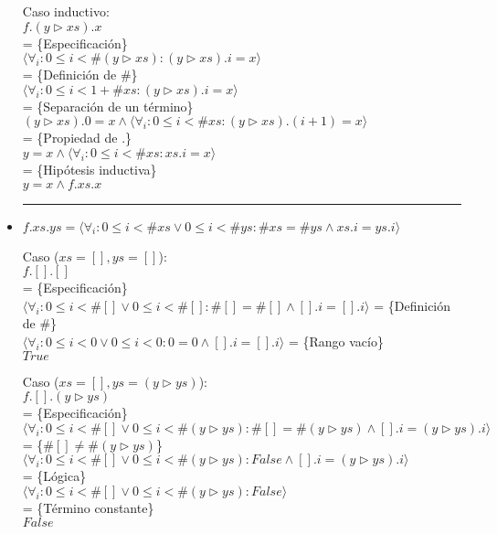 \documentclass[12pt]{article}
\begin{document}
\begin{itemize}
    \bigbreak

    Caso inductivo:\\
    $ f.(y \triangleright xs).x $\\
    = \{Especificación\}\\
    $ \langle \forall_i : 0 \le i < \#(y \triangleright xs) : (y \triangleright xs).i = x \rangle $\\
    = \{Definición de \#\}\\
    $ \langle \forall_i : 0 \le i < 1 + \#xs : (y \triangleright xs).i = x \rangle $\\
    = \{Separación de un término\}\\
    $ (y \triangleright xs).0 = x \land \langle \forall_i : 0 \le i < \#xs : (y \triangleright xs).(i + 1) = x \rangle $\\
    = \{Propiedad de .\}\\
    $ y = x \land \langle \forall_i : 0 \le i < \#xs : xs.i = x \rangle $\\
    = \{Hipótesis inductiva\}\\
    $ y = x \land f.xs.x $

    \rule{\linewidth}{1px}

    \item $ f.xs.ys = \langle \forall_i : 0 \le i < \#xs \lor 0 \le i < \#ys : \#xs = \#ys \land xs.i = ys.i \rangle $

    \bigbreak

    Caso ($ xs = [], ys = []$):\\
    $ f.[].[] $\\
    = \{Especificación\}\\
    $ \langle \forall_i : 0 \le i < \#[] \lor 0 \le i < \#[] : \#[] = \#[] \land [].i = [].i \rangle $
    = \{Definición de \#\}\\
    $ \langle \forall_i : 0 \le i < 0 \lor 0 \le i < 0 : 0 = 0 \land [].i = [].i \rangle $
    = \{Rango vacío\}\\
    $ True $

    \bigbreak

    Caso ($ xs = [], ys = (y \triangleright ys) $):\\
    $ f.[].(y \triangleright ys) $\\
    = \{Especificación\}\\
    $ \langle \forall_i : 0 \le i < \#[] \lor 0 \le i < \#(y \triangleright ys) : \#[] = \#(y \triangleright ys) \land [].i = (y \triangleright ys).i \rangle $\\
    = \{$ \#[] \neq \#(y \triangleright ys) $\}\\
    $ \langle \forall_i : 0 \le i < \#[] \lor 0 \le i < \#(y \triangleright ys) : False \land [].i = (y \triangleright ys).i \rangle $\\
    = \{Lógica\}\\
    $ \langle \forall_i : 0 \le i < \#[] \lor 0 \le i < \#(y \triangleright ys) : False \rangle $\\
    = \{Término constante\}\\
    $ False $


\end{itemize}
\end{document}
